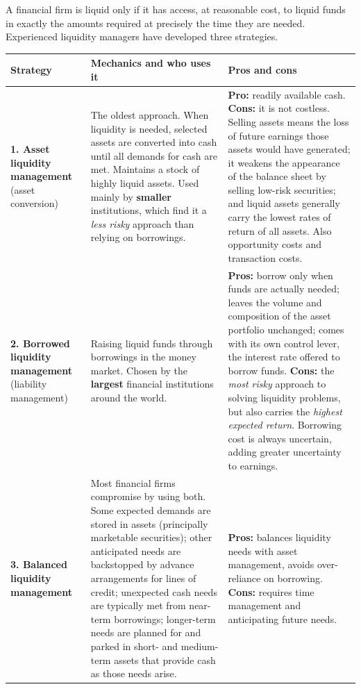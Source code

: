 A financial firm is liquid only if it has access, at reasonable cost, to liquid funds in exactly the amounts required at precisely the time they are needed. Experienced liquidity managers have developed three strategies.

\begin{center}
\small
\begin{tabularx}{\textwidth}{@{}p{3.3cm} X X@{}}
\toprule
\rowcolor{FRMSoft}\textbf{Strategy} & \textbf{Mechanics and who uses it} & \textbf{Pros and cons} \\
\midrule
\textbf{1. Asset liquidity management} \newline (asset conversion) &
The oldest approach. When liquidity is needed, selected assets are converted into cash until all demands for cash are met. Maintains a stock of highly liquid assets. Used mainly by \textbf{smaller} institutions, which find it a \emph{less risky} approach than relying on borrowings. &
\textbf{Pro:} readily available cash. \textbf{Cons:} it is not costless. Selling assets means the loss of future earnings those assets would have generated; it weakens the appearance of the balance sheet by selling low-risk securities; and liquid assets generally carry the lowest rates of return of all assets. Also opportunity costs and transaction costs. \\
\addlinespace
\textbf{2. Borrowed liquidity management} \newline (liability management) &
Raising liquid funds through borrowings in the money market. Chosen by the \textbf{largest} financial institutions around the world. &
\textbf{Pros:} borrow only when funds are actually needed; leaves the volume and composition of the asset portfolio unchanged; comes with its own control lever, the interest rate offered to borrow funds. \textbf{Cons:} the \emph{most risky} approach to solving liquidity problems, but also carries the \emph{highest expected return}. Borrowing cost is always uncertain, adding greater uncertainty to earnings. \\
\addlinespace
\textbf{3. Balanced liquidity management} &
Most financial firms compromise by using both. Some expected demands are stored in assets (principally marketable securities); other anticipated needs are backstopped by advance arrangements for lines of credit; unexpected cash needs are typically met from near-term borrowings; longer-term needs are planned for and parked in short- and medium-term assets that provide cash as those needs arise. &
\textbf{Pros:} balances liquidity needs with asset management, avoids over-reliance on borrowing. \textbf{Cons:} requires time management and anticipating future needs. \\
\bottomrule
\end{tabularx}
\end{center}

